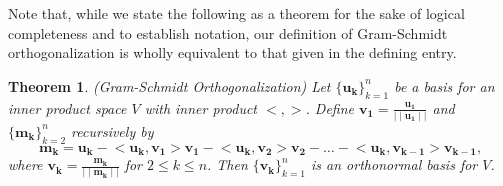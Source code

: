 \documentclass[12pt]{article}
\theoremstyle{plain}
\newtheorem*{thm}{Theorem}
\begin{document}
Note that, while we state the following as a theorem for the sake of logical completeness and to establish notation, our definition of Gram-Schmidt orthogonalization is wholly equivalent to that given in the defining entry.
\begin{thm}
\emph{(Gram-Schmidt Orthogonalization)}
Let $\{\mathbf{u_k}\}_{k=1}^n$ be a basis for an inner product space $V$ with inner product $\big<,\big>$. Define $\mathbf{v_1}=\tfrac{\mathbf{u_1}}{\mid\mid\mathbf{u_1}\mid\mid}$ and $\{\mathbf{m_k}\}_{k=2}^n$ recursively by 
\begin{equation}
\mathbf{m_k}=\mathbf{u_k}-\big<\mathbf{u_k},\mathbf{v_1}\big>\mathbf{v_1}-
\big<\mathbf{u_k},\mathbf{v_2}\big>\mathbf{v_2}-\ldots
-\big<\mathbf{u_k},\mathbf{v_{k-1}}\big>\mathbf{v_{k-1}}\text{,}
\end{equation}
where $\mathbf{v_k}=\tfrac{\mathbf{m_k}}{\mid\mid\mathbf{m_k}\mid\mid}$ for $2\leq k\leq n$. Then $\{\mathbf{v_k}\}_{k=1}^n$ is an orthonormal basis for $V$. 
\end{thm}
\end{document}
